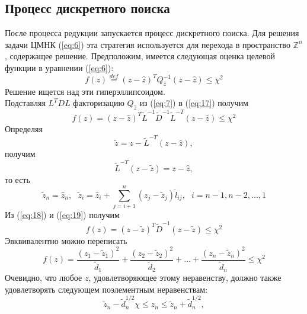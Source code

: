 \documentclass[12pt]{matmex-diploma}
\begin{document}
\subsection{Процесс дискретного поиска}
После процесса редукции запускается процесс дискретного поиска. Для решения
задачи ЦМНК (\ref{eq:6}) эта стратегия используется для перехода 
в пространство $\mathbb{Z}^n$, содержащее решение. Предположим, имеется
следующая оценка целевой функции в уравнении (\ref{eq:6}):
\begin{equation}
        f(z) \overset{def}{=} (z - \hat{z})^TQ_{\hat{z}}^{-1}(z - \hat{z}) \leq \chi^2
        \label{eq:17}
\end{equation}
Решение ищется над эти гиперэллипсоидом. \\ 
Подставляя $L^T D L$ факторизацию $Q_{\hat{z}}$ из (\ref{eq:7}) в (\ref{eq:17}) получим
\begin{equation}
        f(z) = (z - \hat{z})^T\tilde{L}^{-1}\tilde{D}^{-1}\tilde{L}^{-T}(z - \hat{z}) \leq \chi^2
        \label{eq:18}
\end{equation}
Определяя
\begin{equation}
     \tilde{z} = z - \tilde{L}^{-T}(z - \hat{z}),
     \label{eq:19}
\end{equation}
получим 
\begin{equation*}
    \tilde{L}^{-T}(z - \tilde{z}) = z - \hat{z},
\end{equation*}
то есть
\begin{equation}
     \tilde{z}_n = \hat{z}_n, \ \ \
     \tilde{z}_i = \hat{z}_i + \sum^{n}_{j=i+1}{(z_j - \tilde{z}_j)\tilde{l}_{ij}}, \ \ \
     i = n - 1, n - 2, ..., 1
     \label{eq:20}
\end{equation}
Из (\ref{eq:18}) и 
(\ref{eq:19}) получим
\begin{equation*}
        f(z) = (z - \tilde{z})^T\tilde{D}^{-1}(z - \tilde{z}) \leq \chi^2
\end{equation*}
Эвквивалентно можно переписать
\begin{equation}
      f(z) = \frac{(z_1 - \tilde{z}_1)^2}{\tilde{d}_1} +
      \frac{(z_2 - \tilde{z}_2)^2}{\tilde{d}_2} + ... +
      \frac{(z_n - \tilde{z}_n)^2}{\tilde{d}_n} \leq \chi^2
     \label{eq:21}
\end{equation}
Очевидно, что любое $z$, удовлетворяющее этому неравенству, должно также
удовлетворять следующем поэлементным неравенствам:
\newpage
\begin{equation}
     \tilde{z}_n - \tilde{d}^{1/2}_n \chi \leq z_n \leq \tilde{z}_n + \tilde{d}^{1/2}_n,
     \label{eq:22}
\end{equation}
\end{document}
